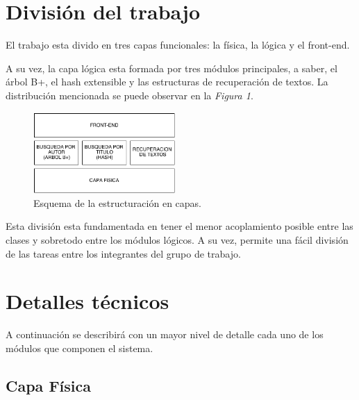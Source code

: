 \documentclass{article}
\begin{document}
\section{División del trabajo}

	El trabajo esta divido en tres capas funcionales: la física, la lógica y el front-end.
	\par
	A su vez, la capa lógica esta formada por tres módulos principales, a saber, el árbol B+, el hash extensible y las estructuras de recuperación de textos. La distribución mencionada se puede observar en la \textit{Figura 1}.
	\bigskip\medskip


\begin{figure}[h]
	\centering
	\includegraphics[width=0.48\textwidth]{images/DivisionModulos.png}
	\medskip
	\caption{Esquema de la estructuración en capas.}
\end{figure}
\bigskip\smallskip


	Esta división esta fundamentada en tener el menor acoplamiento posible entre las clases y sobretodo entre los módulos lógicos. A su vez, permite una fácil división de las tareas entre los integrantes del grupo de trabajo.
	\medskip




\section{Detalles técnicos}

	A continuación se describirá con un mayor nivel de detalle cada uno de los módulos que componen el sistema. \\


\subsection{Capa Física}
	
\end{document}
